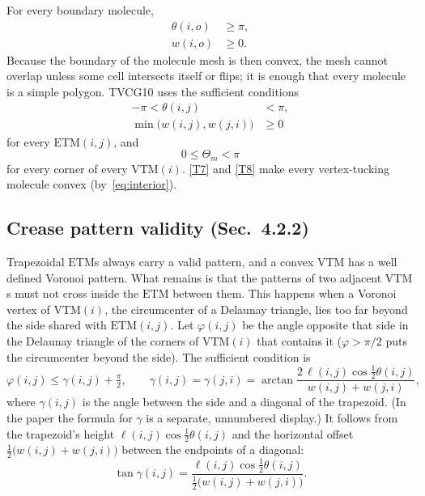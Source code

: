 \documentclass[11pt]{article}
\theoremstyle{definition}
\newcommand{\ETM}{\mathrm{ETM}}
\newcommand{\VTM}{\mathrm{VTM}}
\begin{document}
For every boundary molecule,
\begin{align}
  \theta(i,o) &\ge \pi, \tag{T4}\label{T4}\\
  w(i,o) &\ge 0. \tag{T5}\label{T5}
\end{align}
Because the boundary of the molecule mesh is then convex, the mesh cannot
overlap unless some cell intersects itself or flips; it is enough that every
molecule is a simple polygon. TVCG10 uses the sufficient conditions
\begin{align}
  -\pi < \theta(i,j) &< \pi, \tag{T6}\label{T6}\\
  \min\bigl(w(i,j), w(j,i)\bigr) &\ge 0 \tag{T7}\label{T7}
\end{align}
for every $\ETM(i,j)$, and
\begin{equation}
  0 \le \Theta_m < \pi \tag{T8}\label{T8}
\end{equation}
for every corner of every $\VTM(i)$. \eqref{T7} and \eqref{T8} make every
vertex-tucking molecule convex (by~\eqref{eq:interior}).

\subsection{Crease pattern validity (Sec.~4.2.2)}

Trapezoidal $\ETM$s always carry a valid pattern, and a convex $\VTM$ has a well
defined Voronoi pattern. What remains is that the patterns of two adjacent
$\VTM$s must not cross inside the $\ETM$ between them. This happens when a
Voronoi vertex of $\VTM(i)$, the circumcenter of a Delaunay triangle, lies too
far beyond the side shared with $\ETM(i,j)$. Let $\varphi(i,j)$ be the angle
opposite that side in the Delaunay triangle of the corners of $\VTM(i)$ that
contains it ($\varphi > \pi/2$ puts the circumcenter beyond the side). The
sufficient condition is
\begin{equation}
  \varphi(i,j) \le \gamma(i,j) + \tfrac{\pi}{2},
  \qquad
  \gamma(i,j) = \gamma(j,i) = \arctan
    \frac{2\,\ell(i,j)\cos\frac12\theta(i,j)}{w(i,j) + w(j,i)} ,
  \tag{T9}\label{T9}
\end{equation}
where $\gamma(i,j)$ is the angle between the side and a diagonal of the
trapezoid. (In the paper the formula for $\gamma$ is a separate, unnumbered
display.) It follows from the trapezoid's height
$\ell(i,j)\cos\frac12\theta(i,j)$ and the horizontal offset
$\frac12\bigl(w(i,j) + w(j,i)\bigr)$ between the endpoints of a diagonal:
\begin{equation}
  \tan\gamma(i,j) =
  \frac{\ell(i,j)\cos\frac12\theta(i,j)}{\frac12\bigl(w(i,j) + w(j,i)\bigr)} .
  \label{eq:gamma}
\end{equation}
\end{document}
